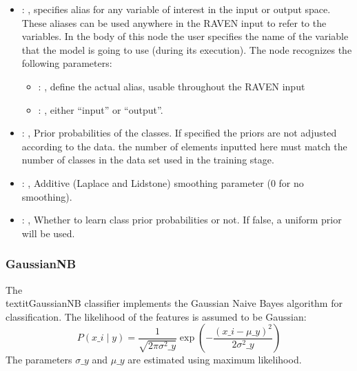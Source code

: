 \begin{itemize}
    \item {}: , 
      specifies alias for         any variable of interest in the input or output space. These
      aliases can be used anywhere in the RAVEN input to         refer to the variables. In the body
      of this node the user specifies the name of the variable that the model is going to use
      (during its execution).
      The  node recognizes the following parameters:
        \begin{itemize}
          \item {}: , 
            define the actual alias, usable throughout the RAVEN input
          \item {}: , 
            either ``input'' or ``output''.
      \end{itemize}

    \item {}: , 
      Prior probabilities of the classes. If specified the priors are
      not adjusted according to the data. \nb the number of elements inputted here must
      match the number of classes in the data set used in the training stage.

    \item {}: , 
      Additive (Laplace and Lidstone) smoothing parameter (0 for no smoothing).

    \item {}: , 
      Whether to learn class prior probabilities or not. If false, a uniform
      prior will be used.
  \end{itemize}


\subsubsection{GaussianNB}
  The \\textit{GaussianNB} classifier implements the Gaussian Naive Bayes
  algorithm for classification.                          The likelihood of the features is assumed
  to be Gaussian:                          \begin{equation}                              P(x\_i \mid
  y) = \frac{1}{\sqrt{2\pi\sigma^2\_y}} \exp\left(-\frac{(x\_i -
  \mu\_y)^2}{2\sigma^2\_y}\right)                          \end{equation}                          The
  parameters $\sigma\_y$ and $\mu\_y$ are estimated using maximum likelihood.

